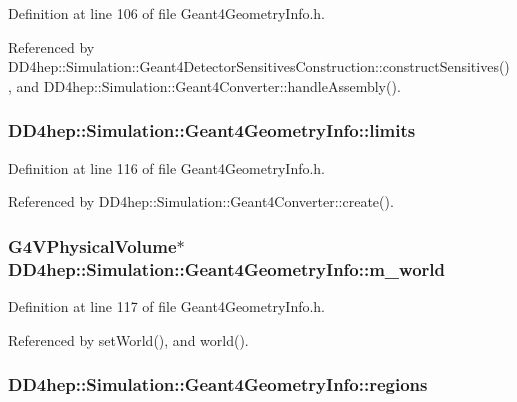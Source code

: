 Definition at line 106 of file Geant4GeometryInfo.h.

Referenced by DD4hep::Simulation::Geant4DetectorSensitivesConstruction::constructSensitives(), and DD4hep::Simulation::Geant4Converter::handleAssembly().\hypertarget{class_d_d4hep_1_1_simulation_1_1_geant4_geometry_info_a913c884fc30046a6eb65702d11f4383f}{
\subsubsection[{limits}]{ {\bf DD4hep::Simulation::Geant4GeometryInfo::limits}}}
\label{class_d_d4hep_1_1_simulation_1_1_geant4_geometry_info_a913c884fc30046a6eb65702d11f4383f}


Definition at line 116 of file Geant4GeometryInfo.h.

Referenced by DD4hep::Simulation::Geant4Converter::create().\hypertarget{class_d_d4hep_1_1_simulation_1_1_geant4_geometry_info_afac417dc2da0efb0dafa60863a56856f}{
\subsubsection[{m\_\-world}]{\setlength{\rightskip}{0pt plus 5cm}G4VPhysicalVolume$\ast$ {\bf DD4hep::Simulation::Geant4GeometryInfo::m\_\-world}}}
\label{class_d_d4hep_1_1_simulation_1_1_geant4_geometry_info_afac417dc2da0efb0dafa60863a56856f}


Definition at line 117 of file Geant4GeometryInfo.h.

Referenced by setWorld(), and world().\hypertarget{class_d_d4hep_1_1_simulation_1_1_geant4_geometry_info_ad224a954b07a8662bb57f3ee0355cdfa}{
\subsubsection[{regions}]{ {\bf DD4hep::Simulation::Geant4GeometryInfo::regions}}}
\label{class_d_d4hep_1_1_simulation_1_1_geant4_geometry_info_ad224a954b07a8662bb57f3ee0355cdfa}


